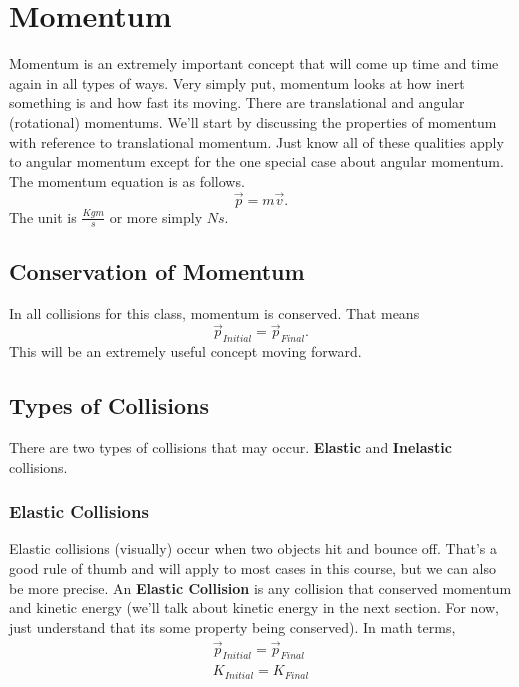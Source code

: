 \section{Momentum}
Momentum is an extremely important concept that will come up time and time again in all types of ways. Very simply put, momentum looks at how inert
something is and how fast its moving. There are translational and angular (rotational) momentums. We'll start by discussing the properties of momentum 
with reference to translational momentum. Just know all of these qualities apply to angular momentum except for the one special case about angular
momentum. The momentum equation is as follows.
\begin{equation}
    \vec{p} = m \vec{v}.
\end{equation}
The unit is $\frac{Kgm}{s}$ or more simply $Ns$.

\subsection{Conservation of Momentum}
In all collisions for this class, momentum is conserved. That means 
\begin{equation}
    \vec{p}_{Initial} = \vec{p}_{Final}.
\end{equation}
This will be an extremely useful concept moving forward.

\subsection{Types of Collisions}
There are two types of collisions that may occur. \textbf{Elastic} and \textbf{Inelastic} collisions. 

\subsubsection{Elastic Collisions}
Elastic collisions (visually) occur when two objects hit and bounce off. That's a good rule of thumb and will apply to most cases in this course, but
we can also be more precise. An \textbf{Elastic Collision} is any collision that conserved momentum and kinetic energy (we'll talk about kinetic energy
in the next section. For now, just understand that its some property being conserved). In math terms,
\begin{eqnarray*}
    \vec{p}_{Initial} = \vec{p}_{Final} \\
    K_{Initial} = K_{Final}
\end{eqnarray*}

